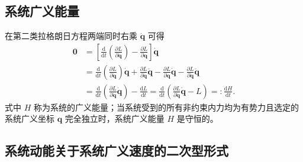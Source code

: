 \subsection{系统广义能量}

在第二类拉格朗日方程两端同时右乘 $\dot{\boldsymbol{q}}$ 可得
\begin{equation}\label{eq:2.29}
\begin{aligned}
\boldsymbol{0} &= \left[ \frac{\mathrm{d}}{\mathrm{d}t}\!\left(\frac{\partial L}{\partial \dot{\boldsymbol{q}}}\right) - \frac{\partial L}{\partial \boldsymbol{q}} \right] \dot{\boldsymbol{q}} \\
&= \frac{\mathrm{d}}{\mathrm{d}t}\!\left(\frac{\partial L}{\partial \dot{\boldsymbol{q}}}\right) \dot{\boldsymbol{q}} + \frac{\partial L}{\partial \dot{\boldsymbol{q}}} \ddot{\boldsymbol{q}} - \frac{\partial L}{\partial \boldsymbol{q}} \dot{\boldsymbol{q}} - \frac{\partial L}{\partial \dot{\boldsymbol{q}}} \ddot{\boldsymbol{q}} \\
&= \frac{\mathrm{d}}{\mathrm{d}t}\!\left(\frac{\partial L}{\partial \dot{\boldsymbol{q}}} \dot{\boldsymbol{q}}\right) - \frac{\mathrm{d}L}{\mathrm{d}t} = \frac{\mathrm{d}}{\mathrm{d}t}\!\left(\frac{\partial L}{\partial \dot{\boldsymbol{q}}} \dot{\boldsymbol{q}} - L\right) =: \frac{\mathrm{d}H}{\mathrm{d}t}.
\end{aligned}
\end{equation}
式中 $H$ 称为系统的广义能量；当系统受到的所有非约束内力均为有势力且选定的系统广义坐标 $\boldsymbol{q}$ 完全独立时，系统广义能量 $H$ 是守恒的。

\subsection{系统动能关于系统广义速度的二次型形式}

